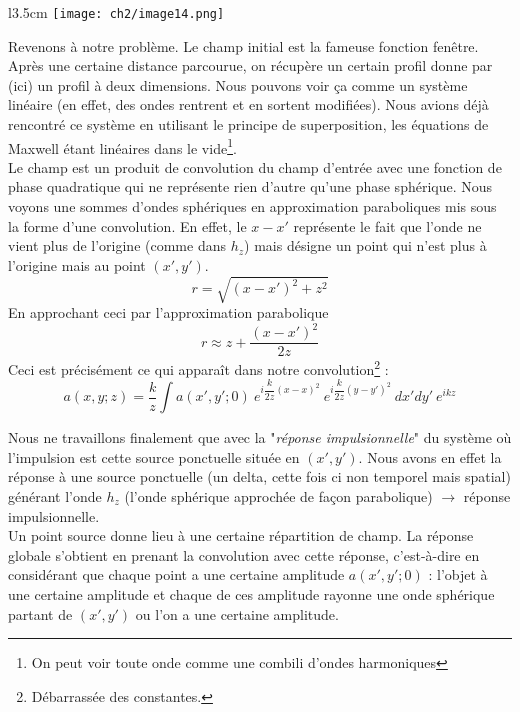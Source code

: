 \begin{wrapfigure}[11]{l}{3.5cm}
\vspace{-5mm}
\texttt{[image: ch2/image14.png]}
\end{wrapfigure}
Revenons à notre problème. Le champ initial est la fameuse fonction fenêtre. Après une certaine 
distance parcourue, on récupère un certain profil donne par (ici) un profil à deux dimensions. 
Nous pouvons voir ça comme un système linéaire (en effet, des ondes rentrent et en sortent 
modifiées). Nous avions déjà rencontré ce système en  utilisant le principe de superposition, 
les équations de Maxwell étant linéaires dans le vide\footnote{On peut voir toute onde comme 
une combili d'ondes harmoniques}. \\

Le champ est un produit de convolution du champ d'entrée avec une fonction de phase quadratique qui 
ne représente rien d'autre qu'une phase sphérique. Nous voyons une sommes d'ondes sphériques en 
approximation paraboliques mis sous la forme d'une convolution. En effet, le $x-x'$ représente le 
fait que l'onde ne vient plus de l'origine (comme dans $h_z$) mais désigne un point qui n'est plus 
à l'origine mais au point $(x',y')$.
\begin{equation}
r = \sqrt{(x-x')^2+z^2}
\end{equation}
En approchant ceci par l'approximation parabolique
\begin{equation}
r \approx z+\dfrac{(x-x')^2}{2z}
\end{equation}
Ceci est précisément ce qui apparaît dans notre convolution\footnote{Débarrassée des constantes.} :
\begin{equation}
a(x,y;z) = \frac{k}{z}\int a(x',y';0)\ e^{i\dfrac{k}{2z}(x-x)^2}\
 e^{i\dfrac{k}{2z}(y-y')^2}\ dx'dy'\  e^{ikz}
\end{equation}

Nous ne travaillons finalement que avec la "\textit{réponse impulsionnelle}" du système où 
l'impulsion est cette source ponctuelle située en $(x',y')$. Nous avons en effet la réponse 
à une source ponctuelle (un delta, cette fois ci non temporel mais spatial) générant l'onde 
$h_z$ (l'onde sphérique approchée de façon parabolique) $\rightarrow$ réponse impulsionnelle.\\


Un point source donne lieu à une certaine répartition de champ. La réponse globale s'obtient en 
prenant la convolution avec cette réponse, c'est-à-dire en considérant que chaque point a une 
certaine amplitude $a(x',y';0)$ : l'objet à une certaine amplitude et chaque de ces amplitude 
rayonne une onde sphérique partant de $(x',y')$ ou l'on a une certaine amplitude. \\


